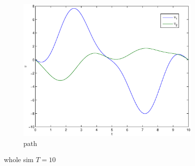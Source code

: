 \begin{figure}
\begin{subfigure}[b]{\textwidth}
\centering
\includegraphics[height=0.3\textheight]{img/final_1_1_10_u.eps}
\caption{path}
\end{subfigure}
\caption{whole sim $T=10$}
\end{figure}

